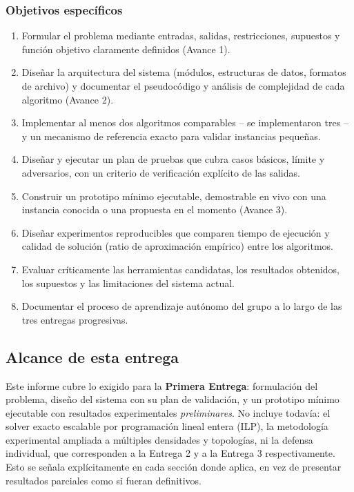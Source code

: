 \documentclass[11pt,a4paper]{article}
\begin{document}
\subsubsection*{Objetivos específicos}
\begin{enumerate}[itemsep=2pt]
	\item Formular el problema mediante entradas, salidas, restricciones, supuestos y
	función objetivo claramente definidos (Avance 1).
	\item Diseñar la arquitectura del sistema (módulos, estructuras de datos, formatos de
	archivo) y documentar el pseudocódigo y análisis de complejidad de cada algoritmo
	(Avance 2).
	\item Implementar al menos dos algoritmos comparables -- se implementaron tres -- y un
	mecanismo de referencia exacto para validar instancias pequeñas.
	\item Diseñar y ejecutar un plan de pruebas que cubra casos básicos, límite y
	adversarios, con un criterio de verificación explícito de las salidas.
	\item Construir un prototipo mínimo ejecutable, demostrable en vivo con una instancia
	conocida o una propuesta en el momento (Avance 3).
	\item Diseñar experimentos reproducibles que comparen tiempo de ejecución y calidad de
	solución (ratio de aproximación empírico) entre los algoritmos.
	\item Evaluar críticamente las herramientas candidatas, los resultados obtenidos, los
	supuestos y las limitaciones del sistema actual.
	\item Documentar el proceso de aprendizaje autónomo del grupo a lo largo de las tres
	entregas progresivas.
\end{enumerate}

\subsection{Alcance de esta entrega}
Este informe cubre lo exigido para la \textbf{Primera Entrega}: formulación del problema,
diseño del sistema con su plan de validación, y un prototipo mínimo ejecutable con
resultados experimentales \emph{preliminares}. No incluye todavía: el solver exacto
escalable por programación lineal entera (ILP), la metodología experimental ampliada a
múltiples densidades y topologías, ni la defensa individual, que corresponden a la Entrega
2 y a la Entrega 3 respectivamente. Esto se señala explícitamente en cada sección donde
aplica, en vez de presentar resultados parciales como si fueran definitivos.
\end{document}
